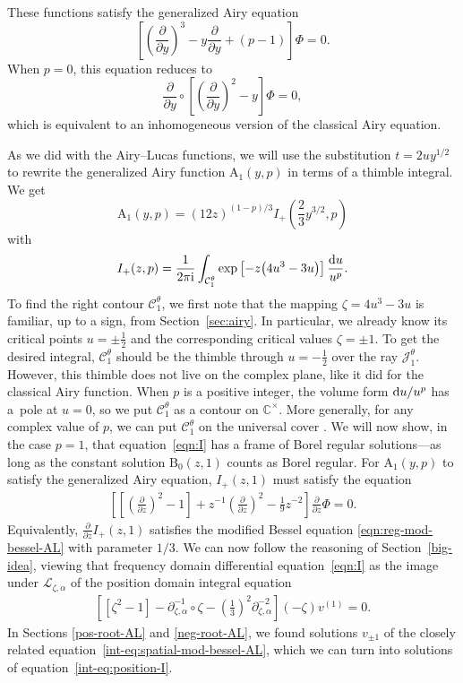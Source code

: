 \documentclass[pdftex]{sigma}
\newcommand{\C}{\mathbb{C}}
\newcommand{\fracderiv}[3]{\partial^{#1}_{#2, #3}}
\newcommand{\laplace}{\mathcal{L}}
\numberwithin{equation}{section}
\begin{document}
\noindent
These functions satisfy the generalized Airy equation
\[ \left[\left(\frac{\partial}{\partial y}\right)^3 - y \frac{\partial}{\partial y} + (p-1)\right] \Phi = 0. \]
When $p = 0$, this equation reduces to
\[ \frac{\partial}{\partial y} \circ \left[\left(\frac{\partial}{\partial y}\right)^2 - y\right] \Phi = 0, \]
which is equivalent to an inhomogeneous version of the classical Airy equation.



As we did with the Airy--Lucas functions, we will use the substitution $t = 2uy^{1/2}$ to rewrite the generalized Airy function $\mathrm{A}_1(y,p)$ in terms of a thimble integral. We get
\[ \mathrm{A}_1(y,p) = (12 z)^{(1-p)/3} I_+\left(\frac{2}{3}y^{3/2},p\right) \]
with
\[ I_+(z,p) = \frac{1}{2 \pi {\rm i}} \int_{\mathcal{C}^\theta_1} \exp\left[-z\bigl(4u^3 - 3u\bigr)\right] \frac{{\rm d}u}{u^p}. \]
To find the right contour $\mathcal{C}_1^\theta$, we first note that the mapping $\zeta = 4u^3 - 3u$ is familiar, up to a sign, from Section~\ref{sec:airy}. In particular, we already know its critical points $u = \pm\frac{1}{2}$ and the corresponding critical values $\zeta = \pm 1$. To get the desired integral, $\mathcal{C}_1^\theta$ should be the thimble through $u = -\frac{1}{2}$ over the ray $\mathcal{J}^\theta_1$. However, this thimble does not live on the complex plane, like it did for the classical Airy function. When $p$ is a positive integer, the volume form ${\rm d}u/u^p$ has a~pole at $u = 0$, so we put $\mathcal{C}_1^\theta$ as a contour on $\C^\times$. More generally, for any complex value of $p$, we can put $\mathcal{C}_1^\theta$ on the universal cover \smash{$\widetilde{\C^\times}$}. We will now show, in the case $p = 1$, that equation~\eqref{eqn:I} has a frame of Borel regular solutions---as long as the constant solution $\mathrm{B}_0(z, 1)$ counts as Borel regular. For $\mathrm{A}_1(y, p)$ to satisfy the generalized Airy equation, $I_+(z,1)$ must satisfy the equation
\begin{gather}\label{eqn:I}
\left[\left[\left(\frac{\partial}{\partial z}\right)^2 - 1\right] + z^{-1} \left(\frac{\partial}{\partial z}\right)^2 - \frac{1}{9} z^{-2} \right] \frac{\partial}{\partial z} \Phi = 0.
\end{gather}
Equivalently, $\frac{\partial}{\partial z} I_+(z, 1)$ satisfies the modified Bessel equation \eqref{eqn:reg-mod-bessel-AL} with parameter $1/3$. We can now follow the reasoning of Section~\ref{big-idea}, viewing that frequency domain differential equation~\eqref{eqn:I} as the image under $\laplace_{\zeta, \alpha}$ of the position domain integral equation
\begin{gather}\label{int-eq:position-I}
\left[ \left[ \zeta^2 - 1 \right] - \fracderiv{-1}{\zeta}{\alpha} \circ \zeta - \left(\frac{1}{3}\right)^2 \fracderiv{-2}{\zeta}{\alpha} \right] (-\zeta) v^{(1)} = 0.
\end{gather}
In Sections \ref{pos-root-AL} and \ref{neg-root-AL}, we found solutions $v_{\pm 1}$ of the closely related equation~\eqref{int-eq:spatial-mod-bessel-AL}, which we can turn into solutions  of equation~\eqref{int-eq:position-I}.
\end{document}
